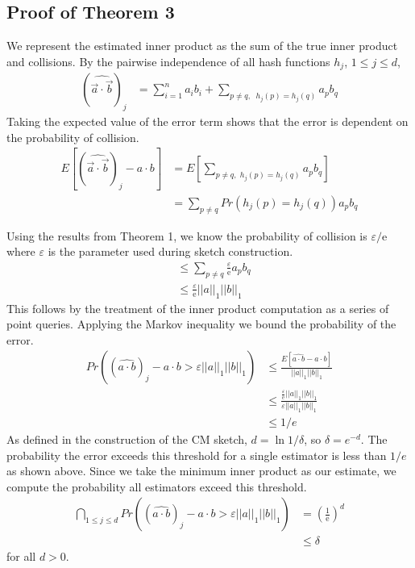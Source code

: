 \documentclass[11pt]{article}
\begin{document}
{	\subsection{Proof of Theorem 3}
		We represent the estimated inner product as the sum of the true inner product and collisions. By the pairwise independence of all hash functions $h_j$, $1 \leq j \leq d$,
		\begin{align}
		(\widehat{\vec a \cdot \vec b})_j &= \sum_{i=1}^n a_ib_i + \sum_{p \neq q, \,\,\ h_j(p)=h_j(q)} a_pb_q
        \end{align}
        Taking the expected value of the error term shows that the error is dependent on the probability of collision.
        \begin{align}
		E\left[(\widehat{\vec a \cdot \vec b})_j - a \cdot b\right] &= E\left[\sum_{p \neq q, \,\, h_j(p)=h_j(q)} a_pb_q\right] \\
		&= \sum_{p \neq q}Pr(h_j(p) = h_j(q))a_pb_q
        \end{align}

        Using the results from Theorem 1, we know the probability of collision is $\varepsilon/\mathrm e$ where $\varepsilon$ is the parameter used during sketch construction.
        \begin{align}
		&\leq \sum_{p \neq q} \frac{\varepsilon}{\mathrm{e}}a_pb_q \\
		&\leq \frac{\varepsilon}{\mathrm e}||a||_1||b||_1
		\end{align}
		This follows by the treatment of the inner product computation as a series of point queries. Applying the Markov inequality we bound the probability of the error.
		\begin{align}
		Pr((\widehat{a \cdot b})_j - a \cdot b > \varepsilon ||a||_1||b||_1) &\leq \frac{E[\widehat{a \cdot b} - a \cdot b]}{||a||_1||b||_1} \\
		&\leq \frac{\frac{\varepsilon}{\mathrm e}||a||_1||b||_1}{\varepsilon||a||_1||b||_1} \\
		& \leq 1/e
        \end{align}
        As defined in the construction of the CM sketch, $d = \ln 1/\delta$, so $\delta = e^{-d}$. The probability the error exceeds this threshold for a single estimator is less than $1/e$ as shown above. Since we take the minimum inner product as our estimate, we compute the probability all estimators exceed this threshold.
        \begin{align}
        \bigcap_{1\leq j \leq d} Pr((\widehat{a \cdot b})_j - a \cdot b > \varepsilon ||a||_1||b||_1) &= \left(\frac{1}{\mathrm e}\right)^d \\
        &\leq \delta
        \end{align}
        for all $d > 0$.


}
\end{document}
